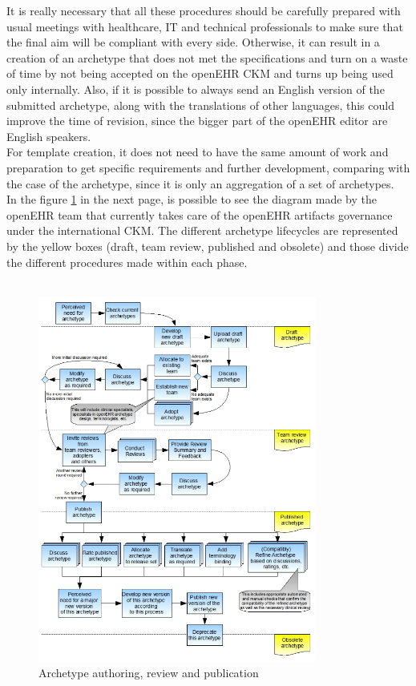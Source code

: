 \documentclass[mim_thesis.tex]{subfiles}
\begin{document}
It is really necessary that all these procedures should be carefully prepared with usual meetings with healthcare, IT and technical professionals to make sure that the final aim will be compliant with every side. Otherwise, it can result in a creation of an archetype that does not met the specifications and turn on a waste of time by not being accepted on the openEHR CKM and turns up being used only internally. Also, if it is possible to always send an English version of the submitted archetype, along with the translations of other languages, this could improve the time of revision, since the bigger part of the openEHR editor are English speakers. \\

For template creation, it does not need to have the same amount of work and preparation to get specific requirements and further development, comparing with the case of the archetype, since it is only an aggregation of a set of archetypes. \\

In the figure \ref{fig:arch_auth} in the next page, is possible to see the diagram made by the openEHR team \citep{Leslie2008} that currently takes care of the openEHR artifacts governance under the international CKM. The different archetype lifecycles are represented by the yellow boxes (draft, team review, published and obsolete) and those divide the different procedures made within each phase. \\

\vfill
~

\begin{figure}[H]
	\centering
    \includegraphics[width=0.815\textwidth]{img/arch_auth.PNG}
	\caption{Archetype authoring, review and publication \citep{Leslie2008}}
	\label{fig:arch_auth}
\end{figure}
\end{document}
